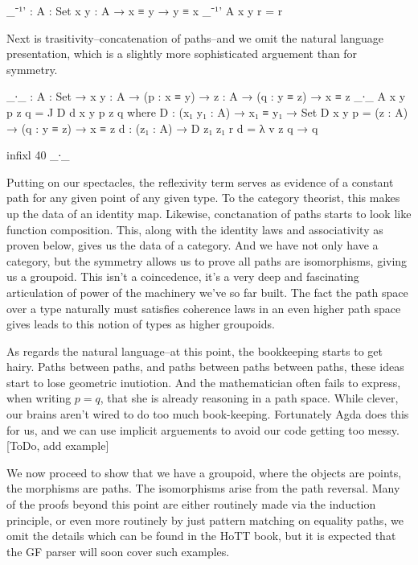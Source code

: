 \documentclass[11pt, a4paper]{article}
\begin{document}
\begin{code}

  _⁻¹' : {A : Set} {x y : A} → x ≡ y → y ≡ x
  _⁻¹' {A} {x} {y} r = r

\end{code}

Next is trasitivity--concatenation of paths--and we omit the natural language
presentation, which is a slightly more sophisticated arguement than for
symmetry.  


\begin{code}
  _∙_ : {A : Set} → {x y : A} → (p : x ≡ y) → {z : A} → (q : y ≡ z) → x ≡ z
  _∙_ {A} {x} {y} p {z} q = J D d x y p z q
      where
      D : (x₁ y₁ : A) → x₁ ≡ y₁ → Set
      D x y p = (z : A) → (q : y ≡ z) → x ≡ z
      d : (z₁ : A) → D z₁ z₁ r
      d = λ v z q → q

  infixl 40 _∙_
\end{code}

Putting on our spectacles, the reflexivity term serves as evidence of a
constant path for any given point of any given type. To the category theorist,
this makes up the data of an identity map. Likewise, conctanation of paths
starts to look like function composition. This, along with the identity laws
and associativity as proven below, gives us the data of a category. And we have
not only have a category, but the symmetry allows us to prove all paths are
isomorphisms, giving us a groupoid. This isn't a coincedence, it's a very deep
and fascinating articulation of power of the machinery we've so far built. The
fact the path space over a type naturally must satisfies coherence laws in an
even higher path space gives leads to this notion of types as higher groupoids.  

As regards the natural language--at this point, the bookkeeping starts to get hairy.  Paths between paths, and paths between paths between paths, these ideas start to lose geometric inutiotion. And the mathematician often fails to express, when writing $p= q$, that she is already reasoning in a path space. While clever, our brains aren't wired to do too much book-keeping.  Fortunately Agda does this for us, and we can use implicit arguements to avoid our code getting too messy.  [ToDo, add example]

We now proceed to show that we have a groupoid, where the objects are points,
the morphisms are paths. The isomorphisms arise from the path reversal.  Many
of the proofs beyond this point are either routinely made via the induction
principle, or even more routinely by just pattern matching on equality paths,
we omit the details which can be found in the HoTT book, but it is expected
that the GF parser will soon cover such examples.
\end{document}
